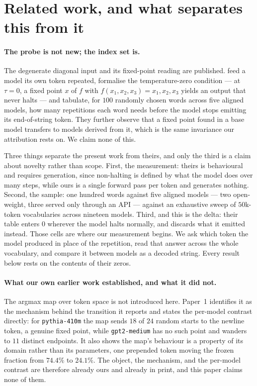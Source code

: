 \documentclass[11pt]{article}
\begin{document}
\section{Related work, and what separates this from it}\label{sec:delta}

\paragraph{The probe is not new; the index set is.}
The degenerate diagonal input and its fixed-point reading are published.
\citet{hammouri2025nonhalting} feed a model its own token repeated, formalise the temperature-zero
condition --- at $\tau = 0$, a fixed point $x$ of $f$ with $f(x_1,x_2,x_3) = x_1,x_2,x_3$ yields an
output that never halts --- and tabulate, for $100$ randomly chosen words across five aligned models,
how many repetitions each word needs before the model stops emitting its end-of-string token. They
further observe that a fixed point found in a base model transfers to models derived from it, which
is the same invariance our attribution rests on. We claim none of this.

Three things separate the present work from theirs, and only the third is a claim about novelty
rather than scope. First, the measurement: theirs is behavioural and requires generation, since
non-halting is defined by what the model does over many steps, while ours is a single forward pass
per token and generates nothing. Second, the sample: one hundred words against five aligned models
--- two open-weight, three served only through an API --- against an exhaustive sweep of $50$k-token
vocabularies across nineteen models. Third, and this is the delta: their table enters $0$ wherever
the model halts normally, and discards what it emitted instead. Those cells are where our
measurement begins. We ask which token the model produced in place of the repetition, read that
answer across the whole vocabulary, and compare it between models as a decoded string. Every result
below rests on the contents of their zeros.

\paragraph{What our own earlier work established, and what it did not.}
The argmax map over token space is not introduced here. Paper~1 \citep{veraz2026probes} identifies it
as the mechanism behind the transition it reports and states the per-model contrast directly: for
\texttt{pythia-410m} the map sends $18$ of $24$ random starts to the newline token, a genuine fixed
point, while \texttt{gpt2-medium} has no such point and wanders to $11$ distinct endpoints. It also
shows the map's behaviour is a property of its domain rather than its parameters, one prepended token
moving the frozen fraction from $74.4\%$ to $24.1\%$. The object, the mechanism, and the per-model
contrast are therefore already ours and already in print, and this paper claims none of them.
\end{document}
